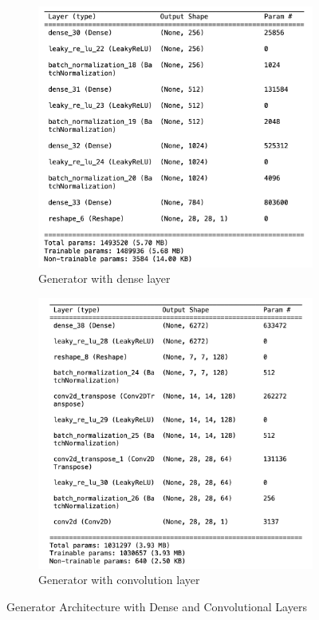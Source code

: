 \begin{figure}[H]
    \centering
    \begin{subfigure}[b]{0.45\linewidth}
        \centering
        \includegraphics[width=\linewidth]{./Images/generator_dense.jpg}
        \caption{Generator with dense layer}
        \label{fig:gen_dense}
    \end{subfigure}
    \hspace{0.05\linewidth}
    \begin{subfigure}[b]{0.45\linewidth}
        \centering
        \includegraphics[width=\linewidth]{./Images/generator_cnn.jpg}
        \caption{Generator with convolution layer}
        \label{fig:gen_conv}
    \end{subfigure}
    \caption{Generator Architecture with Dense and Convolutional Layers}
    \label{fig:gen_architecture}
\end{figure}


